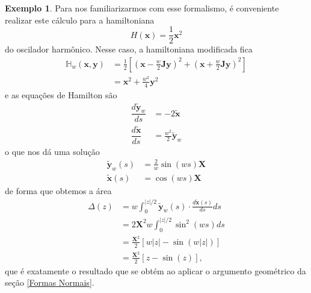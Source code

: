 \documentclass[
	12pt,
	oneside,			%
	a4paper,			%
	english,			%
	brazil				%
	]{abntex2}
\theoremstyle{definition}
\newtheorem{exmp}{Exemplo}[chapter]
\begin{document}
\begin{exmp}
    Para nos familiarizarmos com esse formalismo, é conveniente realizar este cálculo para a hamiltoniana
    \begin{equation}
        H(\mathbf{x}) = \frac{1}{2} \mathbf{x}^2
    \end{equation}
    do oscilador harmônico. Nesse caso, a hamiltoniana modificada fica
    \begin{equation}
        \begin{aligned}
            \mathbb{H}_{w}(\mathbf{x},\mathbf{y}) &= \frac{1}{2}\left[ \left( \mathbf{x} - \frac{w}{2}\mathbf{J} \mathbf{y} \right)^2 + \left( \mathbf{x} + \frac{w}{2}\mathbf{J} \mathbf{y} \right)^2 \right] \\
        &= \mathbf{x}^2 + \frac{w^2}{4}\mathbf{y}^2
        \end{aligned}
    \end{equation}
    e as equações de Hamilton são
    \begin{equation}
    \begin{aligned}
        \dfrac{d \tilde{\mathbf{y}}_w}{ds} &= -2\tilde{\mathbf{x}} \\
        \dfrac{d \tilde{\mathbf{x}}}{ds} &= \frac{w^2}{2} \tilde{\mathbf{y}}_w
    \end{aligned}
\end{equation}
o que nos dá uma solução
\begin{equation}
    \begin{aligned}
        \tilde{\mathbf{y}}_w(s) &= \frac{2}{w} \sin\left( ws\right)\mathbf{X} \\
        \tilde{\mathbf{x}}(s) &=  \cos\left( ws\right)\mathbf{X}
    \end{aligned}
\end{equation}
    de forma que obtemos a área
        \begin{equation}
        \begin{aligned}
        \Delta(z) &= w\int_{0}^{|z|/2} \tilde{ \mathbf{y}}_w(s) \cdot \frac{d\tilde{\mathbf{x}}(s)}{ds}  ds \\
        &= 2 \mathbf{X}^2 w \int_{0}^{|z|/2} \sin^2(ws) ds \\
        &= \frac{\mathbf{X}^2}{2} \left[ w|z| - \sin(w|z|) \right] \\
        &= \frac{\mathbf{X}^2}{2} \left[ z - \sin(z) \right],
    \end{aligned}
\end{equation}
que é exatamente o resultado que se obtém ao aplicar o argumento geométrico da seção \ref{Formas Normais}.
\end{exmp}
\end{document}
